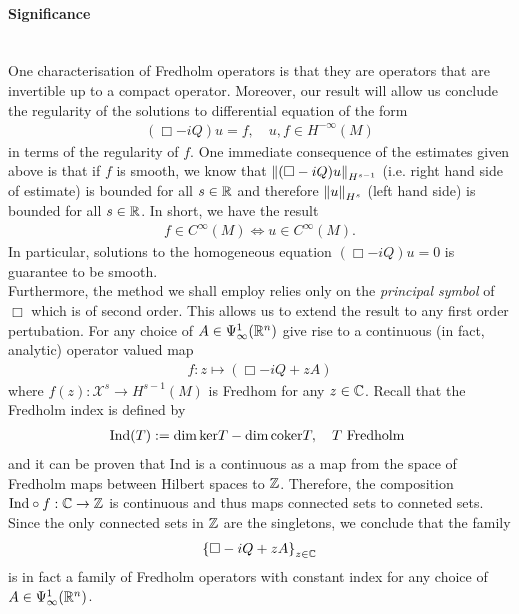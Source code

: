 \documentclass[12pt]{article}
\begin{document}
\paragraph{Significance} \hfill \\
One characterisation of Fredholm operators is that they are operators that are invertible up to a compact operator. Moreover, our result will allow us conclude the regularity of the solutions to differential equation of the form 
\begin{align*}
(\Box - iQ) u = f, \quad u, f \in H^{-\infty}(M)
\end{align*}
in terms of the regularity of $f$. One immediate consequence of the estimates given above is that if $f$ is smooth, we know that $\norm[(\Box - iQ)u ]_{H^{s-1}}$ (i.e. right hand side of estimate) is bounded for all $s \in \R$ and therefore $\norm[u]_{H^s}$ (left hand side) is bounded for all $s \in \R$. In short, we have the result 
\begin{align*}
f \in C^\infty(M) \iff u \in C^\infty(M). 
\end{align*}
In particular, solutions to the homogeneous equation $(\Box - iQ)u = 0$ is guarantee to be smooth. \\


Furthermore, the method we shall employ relies only on the \emph{principal symbol} of $\Box$ which is of second order. This allows us to extend the result to any first order pertubation. For any choice of $A \in \Psi^{1}_{\infty}(\R^n)$ give rise to a continuous (in fact, analytic) operator valued map 
\begin{align*}
f : z \mapsto (\Box - iQ + zA)
\end{align*}
where $f(z) : \mathcal{X}^s \to H^{s - 1}(M)$ is Fredhom for any $z \in \C$. Recall that the Fredholm index is defined by
\begin{align*}
\mathrm{Ind}(T) := \dim \ker T - \dim \coker T, \quad T \text{ Fredholm }
\end{align*}
and it can be proven that $\mathrm{Ind}$ is a continuous as a map from the space of Fredholm maps between Hilbert spaces to $\Z$\cite{Breen2016-od}. Therefore, the composition $\mathrm{Ind} \circ f : \C \to \Z$ is continuous and thus maps connected sets to conneted sets. Since the only connected sets in $\Z$ are the singletons, we conclude that the family
\begin{align*}
\set{\Box - iQ + zA}_{z \in \C} 
\end{align*}
is in fact a family of Fredholm operators with constant index for any choice of $A \in \Psi^{1}_{\infty}(\R^n)$.
\end{document}
